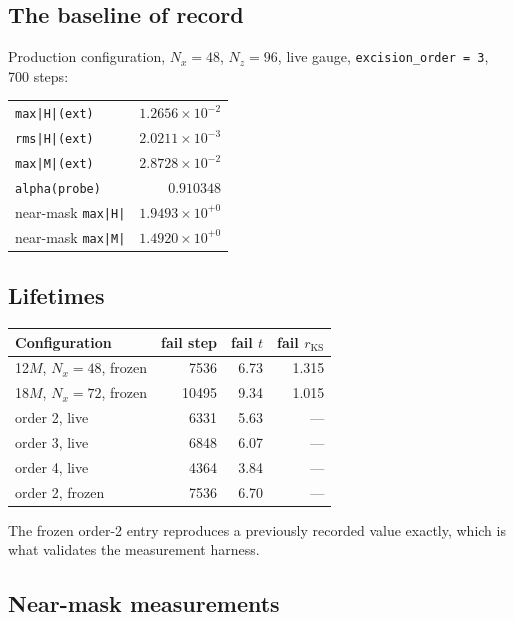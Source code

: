 \subsection{The baseline of record}

Production configuration, $N_x = 48$, $N_z = 96$, live gauge,
\texttt{excision\_order = 3}, 700 steps:
\begin{center}
\begin{tabular}{@{}lr@{}}
\toprule
\texttt{max|H|(ext)} & $1.2656\times10^{-2}$ \\
\texttt{rms|H|(ext)} & $2.0211\times10^{-3}$ \\
\texttt{max|M|(ext)} & $2.8728\times10^{-2}$ \\
\texttt{alpha(probe)} & $0.910348$ \\
near-mask \texttt{max|H|} & $1.9493\times10^{+0}$ \\
near-mask \texttt{max|M|} & $1.4920\times10^{+0}$ \\
\bottomrule
\end{tabular}
\end{center}

\subsection{Lifetimes}

\begin{center}
\begin{tabular}{@{}lrrr@{}}
\toprule
Configuration & fail step & fail $t$ & fail $r_{\mathrm{KS}}$ \\
\midrule
12$M$, $N_x{=}48$, frozen & 7536 & 6.73 & 1.315 \\
18$M$, $N_x{=}72$, frozen & 10495 & 9.34 & 1.015 \\
\midrule
order 2, live & 6331 & 5.63 & --- \\
order 3, live & 6848 & 6.07 & --- \\
order 4, live & 4364 & 3.84 & --- \\
order 2, frozen & 7536 & 6.70 & --- \\
\bottomrule
\end{tabular}
\end{center}

The frozen order-2 entry reproduces a previously recorded value exactly, which
is what validates the measurement harness.

\subsection{Near-mask measurements}

